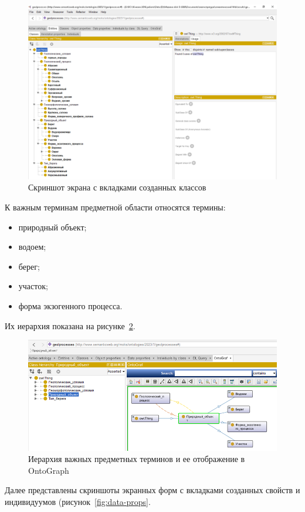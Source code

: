 \documentclass[732,fontsize=14pt,final]{studrep}
\begin{document}
  \begin{figure}[htp]
	\centering
	\includegraphics[width=0.9\linewidth]{pics/image16.png}
    \caption{Скриншот экрана с вкладками созданных классов}
    \label{fig:onto-classes}
  \end{figure}

К важным терминам предметной области относятся термины:
\begin{itemize}
\item природный объект;
\item водоем;
\item берег;
\item участок;
\item форма экзогенного процесса.
\end{itemize}
Их иерархия показана на рисунке~\ref{fig:onto-hierarchy}.

  \begin{figure}[htp]
	\centering
	\includegraphics[width=0.9\linewidth]{pics/image2.png}
    \caption{Иерархия важных предметных терминов и ее отображение в OntoGraph}
    \label{fig:onto-hierarchy}
  \end{figure}

Далее представлены скриншоты экранных форм с вкладками созданных свойств и индивидуумов (рисунок~\ref{fig:data-props}.
\end{document}
